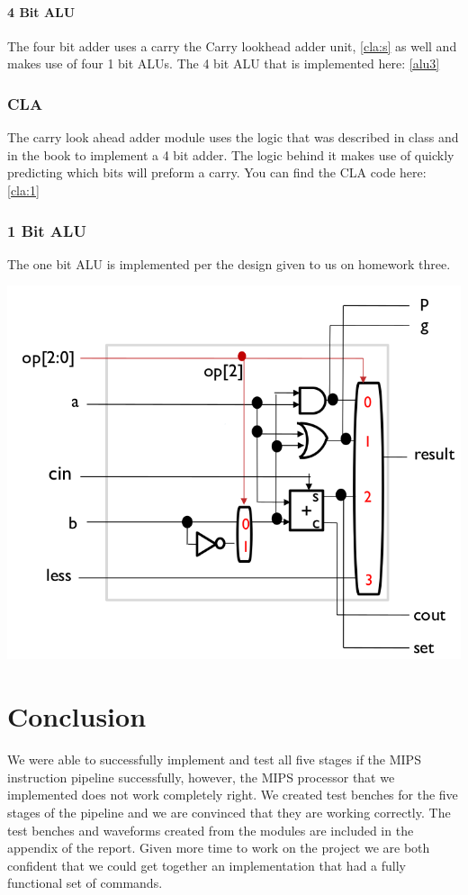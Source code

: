 \documentclass{llncs}
\begin{document}
\paragraph{4 Bit ALU}
The four bit adder uses a carry the Carry lookhead adder unit, \ref{cla:s} as well and makes use of four 1 bit ALUs. 
The 4 bit ALU that is implemented here: \ref{alu3} 
\label{cla:s}
\subsubsection{CLA}
The carry look ahead adder module uses the logic that was described in class and in the book to implement a 4 bit adder.  The logic behind it makes use of quickly predicting which bits will preform a carry.  You can find the CLA code here: \ref{cla:1}
\subsubsection{1 Bit ALU}
The one bit ALU is implemented per the design given to us on homework three.
\begin{center}
\includegraphics[scale=.4]{images/onebitalu.png}
\end{center}

\section{Conclusion}
We were able to successfully implement and test all five stages if the MIPS instruction pipeline successfully, however, the MIPS processor that we implemented does not work completely right. We created test benches for the five stages of the pipeline and we are convinced that they are working correctly. The test benches and waveforms created from the modules are included in the appendix of the report. Given more time to work on the project we are both confident that we could get together an implementation that had a fully functional set of commands.
\end{document}
